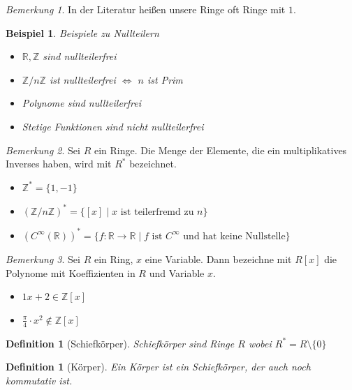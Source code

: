 \documentclass[a4paper,12pt,numbers=noenddot,parskip=full]{scrartcl}
\newcommand{\setZ}{\mathbb{Z}}
\newcommand{\setR}{\mathbb{R}}
\theoremstyle{dotless}
\newtheorem{definition}[theorem]{Definition}
\newtheorem{example}[theorem]{Beispiel}
\theoremstyle{remark}
\newtheorem*{remark}{Bemerkung}
\begin{document}
	\begin{remark}
		In der Literatur heißen unsere Ringe oft Ringe mit $1$.
	\end{remark}

	\begin{example}
		Beispiele zu Nullteilern
		\begin{itemize}
			\item $\setR, \setZ$ sind nullteilerfrei
			\item $\setZ / n \setZ$ ist nullteilerfrei $\Leftrightarrow$ $n$ ist Prim
			\item Polynome sind nullteilerfrei
			\item Stetige Funktionen sind nicht nullteilerfrei
		\end{itemize}
	\end{example}

	\begin{remark}
		Sei $R$ ein Ringe. Die Menge der Elemente, die ein multiplikatives Inverses haben, wird mit $R^*$ bezeichnet.
		
		\begin{itemize}
			\item $\setZ^* = \{ 1, -1 \}$
			\item $(\setZ / n \setZ)^* = \{ [x] \mid x \text{ ist teilerfremd zu } n \}$
			\item $(C^\infty(\setR))^* = \{ f: \setR \to \setR \mid \text{$f$ ist $C^\infty$ und hat keine Nullstelle} \}$
		\end{itemize}
	\end{remark}

	\begin{remark}
		Sei $R$ ein Ring, $x$ eine Variable. Dann bezeichne mit $R[x]$ die Polynome mit Koeffizienten in $R$ und Variable $x$.
		
		\begin{itemize}
			\item $1x + 2 \in \setZ[x]$
			\item $\displaystyle\frac{\pi}{4} \cdot x^2 \notin \setZ[x]$
		\end{itemize}
	\end{remark}

	\begin{definition}[Schiefkörper]
		Schiefkörper sind Ringe $R$ wobei $R^* = R \setminus \{ 0 \}$
	\end{definition}

	\begin{definition}[Körper]
		Ein Körper ist ein Schiefkörper, der auch noch kommutativ ist.
	\end{definition}
\end{document}
